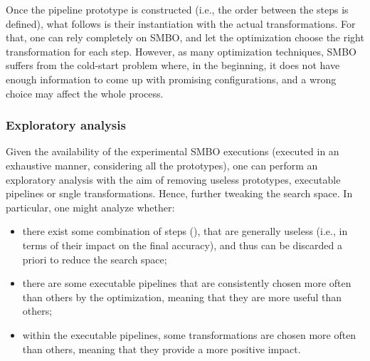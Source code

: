 Once the pipeline prototype is constructed (i.e., the order between the steps is defined), what follows is their instantiation with the actual transformations.
For that, one can rely completely on SMBO, and let the optimization choose the right transformation for each step.
However, as many optimization techniques, SMBO suffers from the cold-start problem where, in the beginning, it does not have enough information to come up with promising configurations, and a wrong choice may affect the whole process.

\subsubsection{Exploratory analysis}
Given the availability of the experimental SMBO executions (executed in an exhaustive manner, considering all the prototypes), one can perform an exploratory analysis with the aim of removing useless prototypes, executable pipelines or sngle transformations.
Hence, further tweaking the search space.
In particular, one might analyze whether:

\begin{itemize}
    \item there exist some combination of steps (), that are generally useless (i.e., in terms of their impact on the final accuracy), and thus can be discarded a priori to reduce the search space;
    \item there are some executable pipelines that are consistently chosen more often than others by the optimization, meaning that they are more useful than others;
    \item within the executable pipelines, some transformations are chosen more often than others, meaning that they provide a more positive impact.
    \end{itemize}


